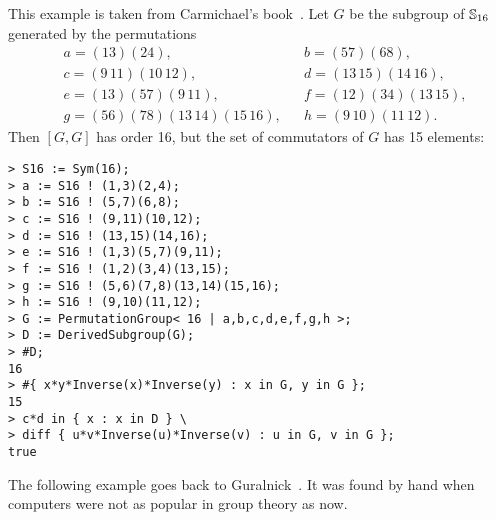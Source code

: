 \begin{example}
This example is taken from Carmichael's book~\cite{MR0075938}.
        Let $G$ be the subgroup of $\mathbb{S}_{16}$ 
        generated by the permutations 
        \begin{align*}
&a = (13)(24),&&
b = (57)(68),\\
&c = (9\,11)(10\,12),&&
d = (13\,15)(14\,16),\\
&e = (13)(57)(9\,11),&&
f = (12)(34)(13\,15),\\
&g = (56)(78)(13\,14)(15\,16),&&
h = (9\,10)(11\,12).
\end{align*}
Then $[G,G]$ has order 16, but the set of commutators of 
$G$ has 15 elements:
\begin{lstlisting}
> S16 := Sym(16);
> a := S16 ! (1,3)(2,4);
> b := S16 ! (5,7)(6,8);
> c := S16 ! (9,11)(10,12);
> d := S16 ! (13,15)(14,16);
> e := S16 ! (1,3)(5,7)(9,11);
> f := S16 ! (1,2)(3,4)(13,15);
> g := S16 ! (5,6)(7,8)(13,14)(15,16);
> h := S16 ! (9,10)(11,12);
> G := PermutationGroup< 16 | a,b,c,d,e,f,g,h >;
> D := DerivedSubgroup(G);
> #D;
16
> #{ x*y*Inverse(x)*Inverse(y) : x in G, y in G };
15    
> c*d in { x : x in D } \ 
> diff { u*v*Inverse(u)*Inverse(v) : u in G, v in G };
true
\end{lstlisting}
\end{example}

The following example goes back to Guralnick~\cite{MR673806}. 
It was found by hand when computers were not as popular
in group theory as now. 

